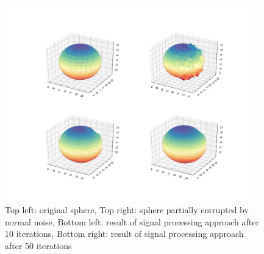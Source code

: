 \documentclass[conference]{IEEEtran}
\begin{document}
\begin{figure}
	\includegraphics[width=4.2in]{8.png}
	\caption{Top left: original sphere, Top right: sphere partially corrupted by normal noise, Bottom left: result of signal processing approach after 10 iterations, Bottom right: result of signal processing approach after 50 iterations}
	\label{8png}
\end{figure}



\end{document}
